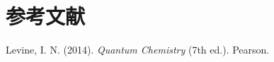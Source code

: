 \chapter{参考文献}
\begin{thebibliography}{9}
	Levine, I. N. (2014). \emph{Quantum Chemistry} (7th ed.). Pearson.
\end{thebibliography}